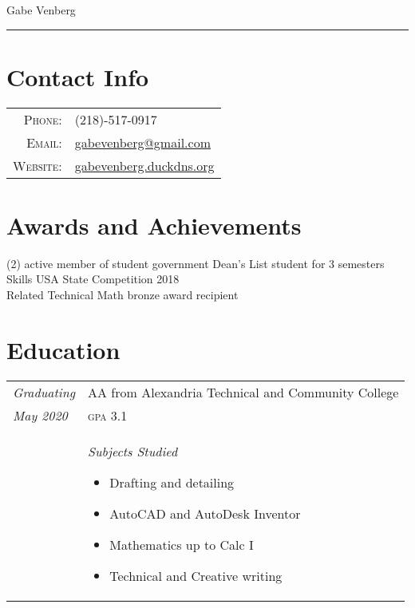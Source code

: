 \documentclass[letterpaper,10pt]{article}
\begin{document}
\pagestyle{empty}%

	\par{\centering
		{\huge Gabe Venberg
	}\bigskip\par}
\hrule
\section*{Contact Info}
	\begin{tabular}{rl}
	\textsc{Phone:} & (218)-517-0917\\
	\textsc{Email:} & \href{mailto:gabevenberg@gmail.com}{gabevenberg@gmail.com}\\
	\textsc{Website:} & \href{gabevenberg.duckdns.org}{gabevenberg.duckdns.org}\\
	\end{tabular}
\section*{Awards and Achievements}
	\begin{tasks}[style=itemize](2)
	\task active member of student government
	\task Dean's List student for 3 semesters
	\task Skills USA State Competition 2018\\Related Technical Math bronze award recipient
	\end{tasks}
\section*{Education}
	\begin{tabular}{R{2cm}|p{14cm}}
	\textsl{Graduating} & AA from Alexandria Technical and Community College\\
	\textsl{May 2020} & \textsc{gpa} 3.1\\
	&\textsl{Subjects Studied} \begin{itemize}[noitemsep]
	\item Drafting and detailing
	\item AutoCAD and AutoDesk Inventor
	\item Mathematics up to Calc I
	\item Technical and Creative writing
	\end{itemize}
	\end{tabular}
\end{document}
